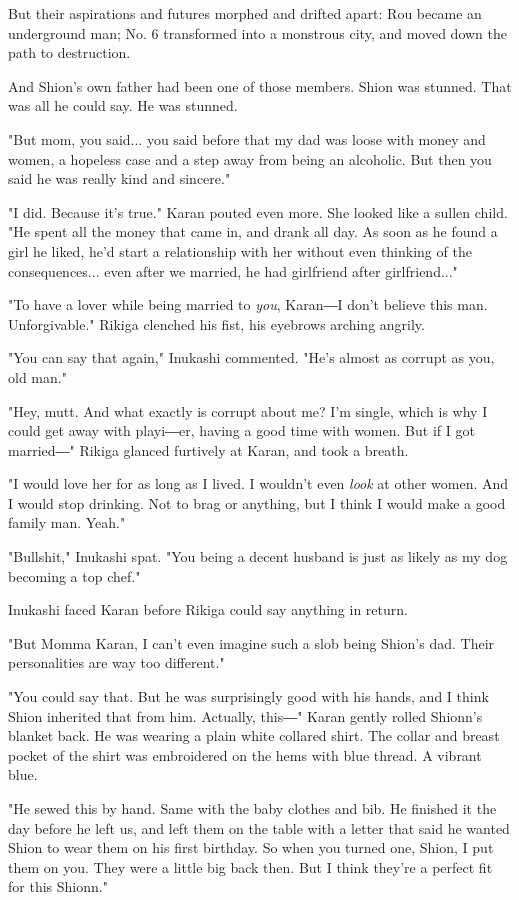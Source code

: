But their aspirations and futures morphed and drifted apart: Rou became
an underground man; No. 6 transformed into a monstrous city, and moved
down the path to destruction.

And Shion's own father had been one of those members. Shion was stunned.
That was all he could say. He was stunned.

"But mom, you said... you said before that my dad was loose with money
and women, a hopeless case and a step away from being an alcoholic. But
then you said he was really kind and sincere."

"I did. Because it's true." Karan pouted even more. She looked like a
sullen child. "He spent all the money that came in, and drank all day.
As soon as he found a girl he liked, he'd start a relationship with her
without even thinking of the consequences... even after we married, he
had girlfriend after girlfriend..."

"To have a lover while being married to \emph{you}, Karan―I don't believe this
man. Unforgivable." Rikiga clenched his fist, his eyebrows arching
angrily.

"You can say that again," Inukashi commented. "He's almost as corrupt as
you, old man."

"Hey, mutt. And what exactly is corrupt about me? I'm single, which is
why I could get away with playi―er, having a good time with women. But
if I got married―" Rikiga glanced furtively at Karan, and took a breath.

"I would love her for as long as I lived. I wouldn't even \emph{look} at other
women. And I would stop drinking. Not to brag or anything, but I think I
would make a good family man. Yeah."

"Bullshit," Inukashi spat. "You being a decent husband is just as likely
as my dog becoming a top chef."

Inukashi faced Karan before Rikiga could say anything in return.

"But Momma Karan, I can't even imagine such a slob being Shion's dad.
Their personalities are way too different."

"You could say that. But he was surprisingly good with his hands, and I
think Shion inherited that from him. Actually, this―" Karan gently
rolled Shionn's blanket back. He was wearing a plain white collared
shirt. The collar and breast pocket of the shirt was embroidered on the
hems with blue thread. A vibrant blue.

"He sewed this by hand. Same with the baby clothes and bib. He finished
it the day before he left us, and left them on the table with a letter
that said he wanted Shion to wear them on his first birthday. So when
you turned one, Shion, I put them on you. They were a little big back
then. But I think they're a perfect fit for this Shionn."

